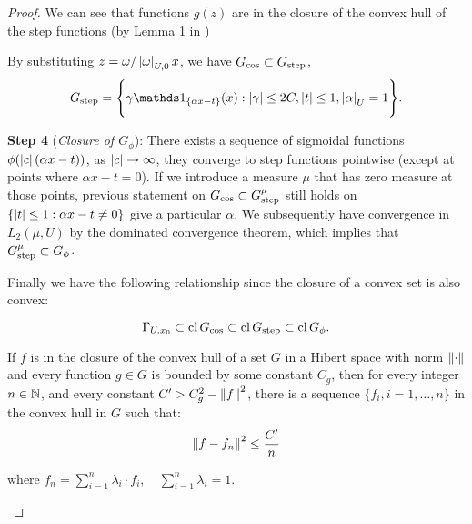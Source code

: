 \begin{proof}
    We can see that functions $g(z)$ are in the closure of the convex hull of
    the step functions (by Lemma 1 in
    \cite{barronUniversalApproximationBounds1993})

    By substituting $z = \omega/\left| \omega \right|_{U, 0} x$, we have $G_{\cos}
    \subset G_{\textnormal{step}}$,
    \begin{equation}
        G_{\textnormal{step}} = \Bigg\{
            \gamma\indicator{\{\alpha x-t\}}(x):
            \abs{\gamma} \leq 2C,
            \abs{t} \leq 1,
            \abs{\alpha}_{U} = 1
        \Bigg\}.
    \end{equation}

    \textbf{Step 4} (\textit{Closure of $G_{\phi}$}): There exists a sequence of
    sigmoidal functions $\phi(\left| c \right|(\alpha x - t))$, as $\left| c \right| \to \infty$,
    they converge to step functions pointwise (except at points where $\alpha x
    - t = 0$). If we introduce a measure $\mu$ that has zero measure at those
    points, previous statement on $G_{\cos} \subset G^{\mu}_{\textnormal{step}}$
    still holds on $\{\left| t \right| \leq 1: \alpha x - t \not=0\}$ give a particular
    $\alpha$. We subsequently have convergence in $L_2(\mu, U)$ by the dominated
    convergence theorem, which implies that $G^{\mu}_{\textnormal{step}} \subset
    G_{\phi}$.

    Finally we have the following relationship since the closure of a convex set
    is also convex:

    \begin{equation*}
        \Gamma_{U, x_0} \subset \operatorname{cl}{G_{\cos}} 
        \subset \operatorname{cl}{G_{\textnormal{step}}} \subset \operatorname{cl}{G_{\phi}}.
    \end{equation*}

    \begin{lemma}
    If $f$ is in the closure of the convex hull of a set $G$ in a Hibert space
    with norm $\left\| \cdot \right\|$ and every function $g \in G$ is bounded by some
    constant $C_g$, then for every integer $n \in \mathbb{N}$, and every constant $C'
    > C_g^2 - \left\| f \right\|^2$, there is a sequence $\{f_i, i = 1, \dots, n\}$ in the
    convex hull in $G$ such that:
    \begin{equation}
        \left\| f - f_n \right\|^2 \leq \frac{C'}{n}
    \end{equation}

    where $f_n = \sum_{i=1}^n \lambda_i \cdot f_i, \quad \sum_{i=1}^n \lambda_i
    = 1$.


\end{lemma}
\end{proof}
